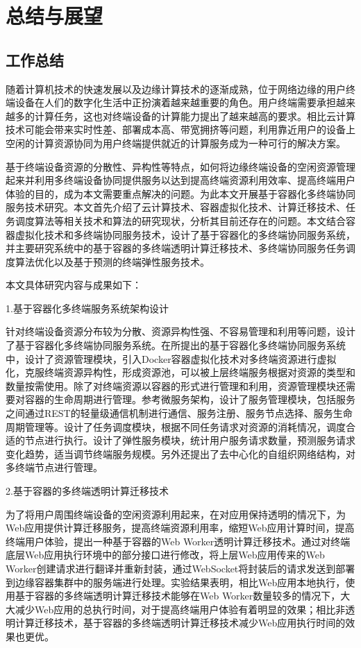 \chapter{总结与展望 }\label{chap:summary_and_future_work}

\section{工作总结}

随着计算机技术的快速发展以及边缘计算技术的逐渐成熟，位于网络边缘的用户终端设备在人们的数字化生活中正扮演着越来越重要的角色。用户终端需要承担越来越多的计算任务，这也对终端设备的计算能力提出了越来越高的要求。相比云计算技术可能会带来实时性差、部署成本高、带宽拥挤等问题，利用靠近用户的设备上空闲的计算资源协同为用户终端提供就近的计算服务成为一种可行的解决方案。

基于终端设备资源的分散性、异构性等特点，如何将边缘终端设备的空闲资源管理起来并利用多终端设备协同提供服务以达到提高终端资源利用效率、提高终端用户体验的目的，成为本文需要重点解决的问题。为此本文开展基于容器化多终端协同服务技术研究。本文首先介绍了云计算技术、容器虚拟化技术、计算迁移技术、任务调度算法等相关技术和算法的研究现状，分析其目前还存在的问题。本文结合容器虚拟化技术和多终端协同服务技术，设计了基于容器化的多终端协同服务系统，并主要研究系统中的基于容器的多终端透明计算迁移技术、多终端协同服务任务调度算法优化以及基于预测的终端弹性服务技术。

本文具体研究内容与成果如下：

1.基于容器化多终端服务系统架构设计

针对终端设备资源分布较为分散、资源异构性强、不容易管理和利用等问题，设计了基于容器化多终端协同服务系统。在所提出的基于容器化多终端协同服务系统中，设计了资源管理模块，引入Docker容器虚拟化技术对多终端资源进行虚拟化，克服终端资源异构性，形成资源池，可以被上层终端服务根据对资源的类型和数量按需使用。除了对终端资源以容器的形式进行管理和利用，资源管理模块还需要对容器的生命周期进行管理。参考微服务架构，设计了服务管理模块，包括服务之间通过REST的轻量级通信机制进行通信、服务注册、服务节点选择、服务生命周期管理等。设计了任务调度模块，根据不同任务请求对资源的消耗情况，调度合适的节点进行执行。设计了弹性服务模块，统计用户服务请求数量，预测服务请求变化趋势，适当调节终端服务规模。另外还提出了去中心化的自组织网络结构，对多终端节点进行管理。

2.基于容器的多终端透明计算迁移技术

为了将用户周围终端设备的空闲资源利用起来，在对应用保持透明的情况下，为Web应用提供计算迁移服务，提高终端资源利用率，缩短Web应用计算时间，提高终端用户体验，提出一种基于容器的Web Worker透明计算迁移技术。通过对终端底层Web应用执行环境中的部分接口进行修改，将上层Web应用传来的Web Worker创建请求进行翻译并重新封装，通过WebSocket将封装后的请求发送到部署到边缘容器集群中的服务端进行处理。实验结果表明，相比Web应用本地执行，使用基于容器的多终端透明计算迁移技术能够在Web Worker数量较多的情况下，大大减少Web应用的总执行时间，对于提高终端用户体验有着明显的效果；相比非透明计算迁移技术，基于容器的多终端透明计算迁移技术减少Web应用执行时间的效果也更优。

